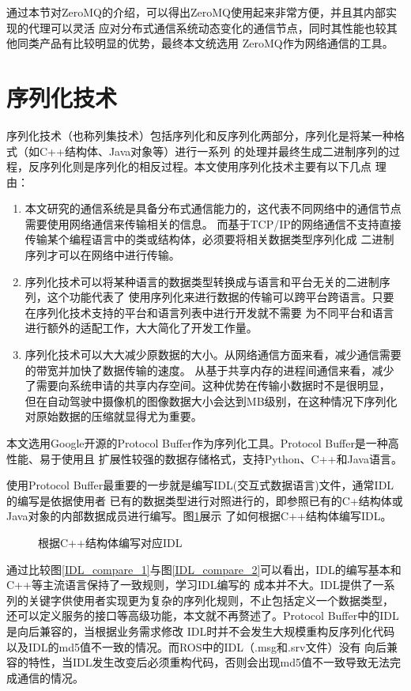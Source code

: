 通过本节对ZeroMQ的介绍，可以得出ZeroMQ使用起来非常方便，并且其内部实现的代理可以灵活
应对分布式通信系统动态变化的通信节点，同时其性能也较其他同类产品有比较明显的优势，最终本文统选用
ZeroMQ作为网络通信的工具。

\section{序列化技术}
序列化技术（也称列集技术）包括序列化和反序列化两部分，序列化是将某一种格式（如C++结构体、Java对象等）进行一系列
的处理并最终生成二进制序列的过程，反序列化则是序列化的相反过程\cite{zj,wangbinbin}。本文使用序列化技术主要有以下几点
理由：
\begin{enumerate}
  \item 本文研究的通信系统是具备分布式通信能力的，这代表不同网络中的通信节点需要使用网络通信来传输相关的信息。
  而基于TCP/IP的网络通信不支持直接传输某个编程语言中的类或结构体，必须要将相关数据类型序列化成
  二进制序列才可以在网络中进行传输。
  \item 序列化技术可以将某种语言的数据类型转换成与语言和平台无关的二进制序列，这个功能代表了
  使用序列化来进行数据的传输可以跨平台跨语言。只要在序列化技术支持的平台和语言列表中进行开发就不需要
  为不同平台和语言进行额外的适配工作，大大简化了开发工作量。
  \item 序列化技术可以大大减少原数据的大小。从网络通信方面来看，减少通信需要的带宽并加快了数据传输的速度。
  从基于共享内存的进程间通信来看，减少了需要向系统申请的共享内存空间。这种优势在传输小数据时不是很明显，
  但在自动驾驶中摄像机的图像数据大小会达到MB级别，在这种情况下序列化对原始数据的压缩就显得尤为重要。
\end{enumerate}
本文选用Google开源的Protocol Buffer作为序列化工具。Protocol Buffer是一种高性能、易于使用且
扩展性较强的数据存储格式，支持Python、C++和Java语言\cite{sxy}。

使用Protocol Buffer最重要的一步就是编写IDL(交互式数据语言)文件，通常IDL的编写是依据使用者
已有的数据类型进行对照进行的，即参照已有的C+结构体或Java对象的内部数据成员进行编写。图\ref{IDL_compare}展示
了如何根据C++结构体编写IDL。
\begin{figure}[H]
  \centering
  \caption{根据C++结构体编写对应IDL}
  \label{IDL_compare}
\end{figure}
通过比较图\ref{IDL_compare_1}与图\ref{IDL_compare_2}可以看出，IDL的编写基本和C++等主流语言保持了一致规则，学习IDL编写的
成本并不大。IDL提供了一系列的关键字供使用者实现更为复杂的序列化规则，不止包括定义一个数据类型，
还可以定义服务的接口等高级功能，本文就不再赘述了。Protocol Buffer中的IDL是向后兼容的，当根据业务需求修改
IDL时并不会发生大规模重构反序列化代码以及IDL的md5值不一致的情况。而ROS中的IDL（.msg和.srv文件）没有
向后兼容的特性，当IDL发生改变后必须重构代码，否则会出现md5值不一致导致无法完成通信的情况。

